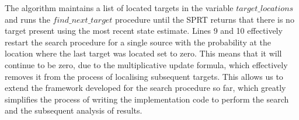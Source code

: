 \normalsize
The algorithm maintains a list of located targets in the variable $target\_locations$ and runs the $find\_next\_target$ procedure until the SPRT returns that there is no target present using the most recent state estimate. Lines 9 and 10 effectively restart the search procedure for a single source with the probability at the location where the last target was located set to zero. This means that it will continue to be zero, due to the multiplicative update formula, which effectively removes it from the process of localising subsequent targets. This allows us to extend the framework developed for the search procedure so far, which greatly simplifies the process of writing the implementation code to perform the search and the subsequent analysis of results.

